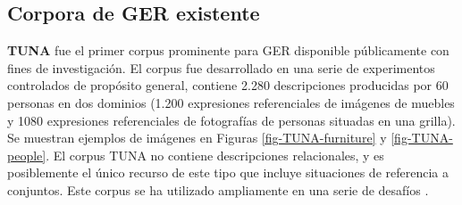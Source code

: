 \subsection{Corpora de GER existente}
\label{sec:corpus2}
\label{sec:corpusTUNA}


{\bf TUNA} \cite{tuna-corpus} fue el primer corpus prominente para GER disponible p\'ublicamente con fines de investigaci\'on. El corpus fue desarrollado en una serie de experimentos controlados de prop\'osito general, contiene 2.280 descripciones producidas por 60 personas en dos dominios (1.200 expresiones referenciales de im\'agenes de muebles y 1080 expresiones referenciales de fotograf\'ias de personas situadas en una grilla). Se muestran ejemplos de im\'agenes en Figuras \ref{fig-TUNA-furniture} y \ref{fig-TUNA-people}. El corpus TUNA no contiene descripciones relacionales, y es posiblemente el \'unico recurso de este tipo que incluye situaciones de referencia a conjuntos. Este corpus se ha utilizado ampliamente en una serie de desaf\'ios \cite{reg2009}. 


